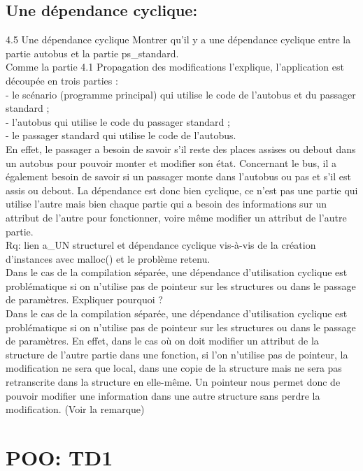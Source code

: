 \documentclass{article}
\begin{document}
\subsection{Une dépendance cyclique:}
4.5 Une dépendance cyclique
Montrer qu’il y a une dépendance cyclique entre la partie autobus et la partie ps\_standard.\\
Comme la partie 4.1 Propagation des modifications l’explique, l’application est découpée en trois parties :\\
- le scénario (programme principal) qui utilise le code de l’autobus et du passager standard ;\\
- l’autobus qui utilise le code du passager standard ;\\
- le passager standard qui utilise le code de l’autobus.\\
En effet, le passager a besoin de savoir s’il reste des places assises ou debout dans un
autobus pour pouvoir monter et modifier son état. Concernant le bus, il a également besoin de savoir si un passager monte dans l’autobus ou pas et s’il est assis ou debout.
La dépendance est donc bien cyclique, ce n’est pas une partie qui utilise l’autre mais bien chaque partie qui a besoin des informations sur un attribut de l’autre pour fonctionner, voire même modifier un attribut de l’autre partie.\\
Rq: lien a\_UN structurel et dépendance cyclique vis-à-vis de la création d'instances avec malloc() et le problème retenu.\\ 
Dans le cas de la compilation séparée, une dépendance d’utilisation cyclique est problématique si on n’utilise pas de pointeur sur les structures ou dans le passage de paramètres. Expliquer pourquoi ?\\
Dans le cas de la compilation séparée, une dépendance d’utilisation cyclique est
problématique si on n’utilise pas de pointeur sur les structures ou dans le passage de paramètres. En effet, dans le cas où on doit modifier un attribut de la structure de l’autre partie dans une fonction, si l’on n’utilise pas de pointeur, la modification ne sera que local, dans une copie de la structure mais ne sera pas retranscrite dans la structure en elle-même. Un pointeur nous permet donc de pouvoir modifier une information dans une autre structure sans perdre la modification. (Voir la remarque)
\section{POO: TD1}
\end{document}
